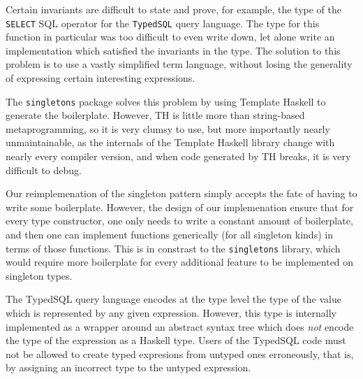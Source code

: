 \begin{description}[leftmargin=1em]

\item[Exceeding complex type level invariants] Certain invariants are difficult to state and prove,
  for example, the type of the \texttt{SELECT} SQL operator for the \texttt{TypedSQL}
  query language. The type for this function in particular was too difficult to even 
  write down, let alone write an implementation which satisfied the invariants 
  in the type. The solution to this problem is to use a vastly simplified term language,
  without losing the generality of expressing certain interesting expressions. 

\item[Singletons have a lot of boilerplate code] The \texttt{singletons}
  package solves this problem by using Template Haskell to generate the
  boilerplate. However, TH is little more than string-based metaprogramming,
  so it is very clumsy to use, but more importantly nearly unmaintainable,
  as the internals of the Template Haskell library change with nearly every
  compiler version, and when code generated by TH breaks, it is very difficult
  to debug. 

  Our reimplemenation of the singleton pattern simply accepts the fate of 
  having to write some boilerplate. However, the design of our implemenation 
  ensure that for every type constructor, one only needs to write a constant 
  amount of boilerplate, and then one can implement functions generically (for 
  all singleton kinds) in terms of those functions. This is in constrast 
  to the \texttt{singletons} library, which would require more boilerplate 
  for every additional feature to be implemented on singleton types. 

\item[Defining a typed term language from an untyped one]
  The TypedSQL query language encodes at the type level the type of the 
  value which is represented by any given expression. However, this
  type is internally implemented as a wrapper around an abstract syntax
  tree which does \emph{not} encode the type of the expression as a Haskell
  type. Users of the TypedSQL code must not be allowed to create typed
  expresions from untyped ones erroneously, that is, by assigning an incorrect
  type to the untyped expression. 
  

\end{description}
